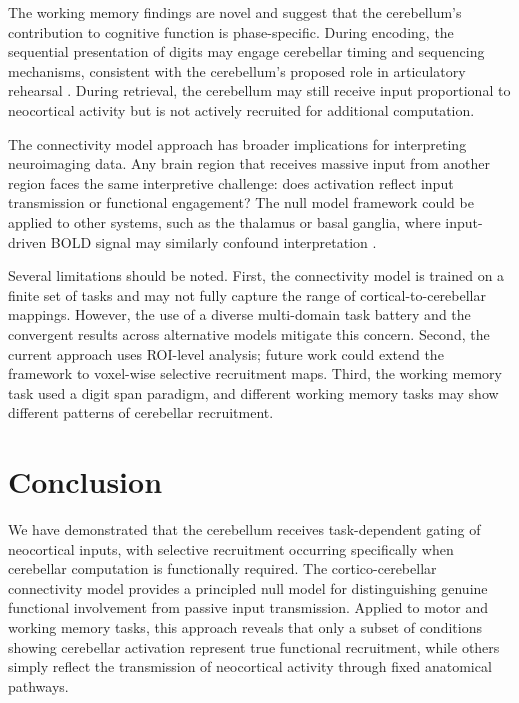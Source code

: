 \documentclass[11pt]{article}
\begin{document}
The working memory findings are novel and suggest that the cerebellum's contribution to cognitive function is phase-specific. During encoding, the sequential presentation of digits may engage cerebellar timing and sequencing mechanisms, consistent with the cerebellum's proposed role in articulatory rehearsal \citep{desmond2005,mariuen2014}. During retrieval, the cerebellum may still receive input proportional to neocortical activity but is not actively recruited for additional computation.

The connectivity model approach has broader implications for interpreting neuroimaging data. Any brain region that receives massive input from another region faces the same interpretive challenge: does activation reflect input transmission or functional engagement? The null model framework could be applied to other systems, such as the thalamus or basal ganglia, where input-driven BOLD signal may similarly confound interpretation \citep{diedrichsen2019}.

Several limitations should be noted. First, the connectivity model is trained on a finite set of tasks and may not fully capture the range of cortical-to-cerebellar mappings. However, the use of a diverse multi-domain task battery and the convergent results across alternative models mitigate this concern. Second, the current approach uses ROI-level analysis; future work could extend the framework to voxel-wise selective recruitment maps. Third, the working memory task used a digit span paradigm, and different working memory tasks may show different patterns of cerebellar recruitment.

\section{Conclusion}

We have demonstrated that the cerebellum receives task-dependent gating of neocortical inputs, with selective recruitment occurring specifically when cerebellar computation is functionally required. The cortico-cerebellar connectivity model provides a principled null model for distinguishing genuine functional involvement from passive input transmission. Applied to motor and working memory tasks, this approach reveals that only a subset of conditions showing cerebellar activation represent true functional recruitment, while others simply reflect the transmission of neocortical activity through fixed anatomical pathways.



\end{document}
